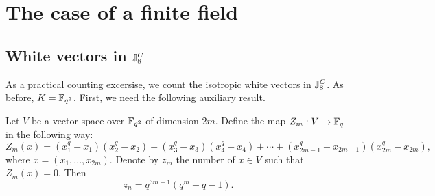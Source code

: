  

\section{The case of a finite field}
\subsection{White vectors in $\mathbb{J}_8^C$}

As a practical counting excersise, we count the isotropic white vectors in $\mathbb{J}_{8}^{C}$.
As before, $K = \mathbb{F}_{q^2}$. First, we need the following auxiliary result.

\begin{lemma}
		\label{lemma:zn}
		Let $V$ be a vector space over $\mathbb{F}_{q^2}$ of dimension $2m$. 
		Define the map $Z_m: V \rightarrow \mathbb{F}_q$ in the following way:
		\begin{equation*}
			Z_m(x) = (x_1^q - x_1) (x_2^q - x_2) + (x_3^q - x_3) (x_4^q - x_4) + \cdots +
			(x_{2m-1}^q-x_{2m-1}) (x_{2m}^q - x_{2m}),
		\end{equation*}
		where $x = (x_1, ..., x_{2m})$. 
		Denote by $z_m$ the number of $x\in V$ such that $Z_m(x) = 0$. Then
		\begin{equation*}
			z_n = q^{3m-1}(q^m+q-1).
		\end{equation*}
\end{lemma}

